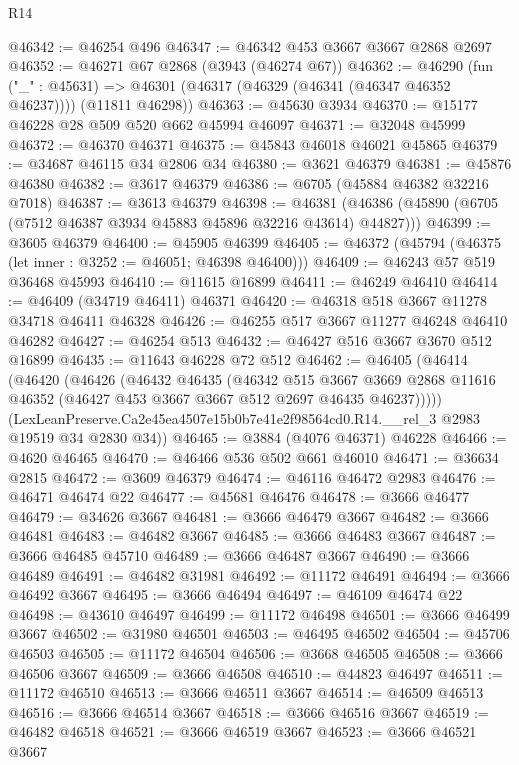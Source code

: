 \begin{lexlean}{R14}
\begin{coremodule}
@46342 := @46254 @496
@46347 := @46342 @453 @3667 @3667 @2868 @2697
@46352 := @46271 @67 @2868 (@3943 (@46274 @67))
@46362 := @46290
    (fun ("_" : @45631) => @46301 (@46317 (@46329 (@46341 (@46347 @46352 @46237)))) (@11811 @46298))
@46363 := @45630 @3934
@46370 := @15177 @46228 @28 @509 @520 @662 @45994 @46097
@46371 := @32048 @45999
@46372 := @46370 @46371
@46375 := @45843 @46018 @46021 @45865
@46379 := @34687 @46115 @34 @2806 @34
@46380 := @3621 @46379
@46381 := @45876 @46380
@46382 := @3617 @46379
@46386 := @6705 (@45884 @46382 @32216 @7018)
@46387 := @3613 @46379
@46398 := @46381 (@46386 (@45890 (@6705 (@7512 @46387 @3934 @45883 @45896 @32216 @43614) @44827)))
@46399 := @3605 @46379
@46400 := @45905 @46399
@46405 := @46372 (@45794 (@46375 (let inner : @3252 := @46051; @46398 @46400)))
@46409 := @46243 @57 @519 @36468 @45993
@46410 := @11615 @16899
@46411 := @46249 @46410
@46414 := @46409 (@34719 @46411) @46371
@46420 := @46318 @518 @3667 @11278 @34718 @46411 @46328
@46426 := @46255 @517 @3667 @11277 @46248 @46410 @46282
@46427 := @46254 @513
@46432 := @46427 @516 @3667 @3670 @512 @16899
@46435 := @11643 @46228 @72 @512
@46462 := @46405
    (@46414
      (@46420
        (@46426
          (@46432
            @46435
            (@46342
              @515
              @3667
              @3669
              @2868
              @11616
              @46352
              (@46427 @453 @3667 @3667 @512 @2697 @46435 @46237)))))
      (LexLeanPreserve.Ca2e45ea4507e15b0b7e41e2f98564cd0.R14.__rel_3 @2983 @19519 @34 @2830 @34))
@46465 := @3884 (@4076 @46371) @46228
@46466 := @4620 @46465
@46470 := @46466 @536 @502 @661 @46010
@46471 := @36634 @2815
@46472 := @3609 @46379
@46474 := @46116 @46472 @2983
@46476 := @46471 @46474 @22
@46477 := @45681 @46476
@46478 := @3666 @46477
@46479 := @34626 @3667
@46481 := @3666 @46479 @3667
@46482 := @3666 @46481
@46483 := @46482 @3667
@46485 := @3666 @46483 @3667
@46487 := @3666 @46485 @45710
@46489 := @3666 @46487 @3667
@46490 := @3666 @46489
@46491 := @46482 @31981
@46492 := @11172 @46491
@46494 := @3666 @46492 @3667
@46495 := @3666 @46494
@46497 := @46109 @46474 @22
@46498 := @43610 @46497
@46499 := @11172 @46498
@46501 := @3666 @46499 @3667
@46502 := @31980 @46501
@46503 := @46495 @46502
@46504 := @45706 @46503
@46505 := @11172 @46504
@46506 := @3668 @46505
@46508 := @3666 @46506 @3667
@46509 := @3666 @46508
@46510 := @44823 @46497
@46511 := @11172 @46510
@46513 := @3666 @46511 @3667
@46514 := @46509 @46513
@46516 := @3666 @46514 @3667
@46518 := @3666 @46516 @3667
@46519 := @46482 @46518
@46521 := @3666 @46519 @3667
@46523 := @3666 @46521 @3667

\end{coremodule}
\end{lexlean}
